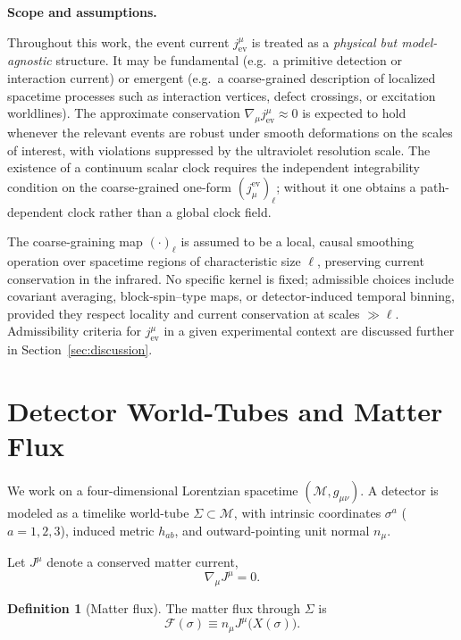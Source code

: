 \documentclass[11pt, a4paper]{article}
\theoremstyle{definition}
\newtheorem{definition}{Definition}[section]
\theoremstyle{plain}
\theoremstyle{remark}
\numberwithin{equation}{section}
\newcommand{\Sig}{\Sigma}
\newcommand{\F}{\mathcal{F}}
\begin{document}
        \medskip\noindent\textbf{Scope and assumptions.}\par
            Throughout this work, the event current $j^\mu_{\mathrm{ev}}$ is treated as a \emph{physical but model-agnostic} structure. It may be fundamental (e.g.\ a primitive detection or interaction current) or emergent (e.g.\ a coarse-grained description of localized spacetime processes such as interaction vertices, defect crossings, or excitation worldlines). The approximate conservation $\nabla_\mu j^\mu_{\mathrm{ev}}\approx 0$ is expected to hold whenever the relevant events are robust under smooth deformations on the scales of interest, with violations suppressed by the ultraviolet resolution scale. The existence of a continuum scalar clock requires the independent integrability condition on the coarse-grained one-form $(j^{\mathrm{ev}}_\mu)_\ell$; without it one obtains a path-dependent clock rather than a global clock field.
            
            The coarse-graining map $(\cdot)_\ell$ is assumed to be a local, causal smoothing operation over spacetime regions of characteristic size $\ell$, preserving current conservation in the infrared. No specific kernel is fixed; admissible choices include covariant averaging, block-spin--type maps, or detector-induced temporal binning, provided they respect locality and current conservation at scales $\gg\ell$.
            Admissibility criteria for $j^\mu_{\mathrm{ev}}$ in a given experimental context are discussed further in Section~\ref{sec:discussion}.

    \section{Detector World-Tubes and Matter Flux}
    
    We work on a four-dimensional Lorentzian spacetime $(\mathcal{M},g_{\mu\nu})$. A detector is modeled as a timelike world-tube $\Sig \subset \mathcal{M}$, with intrinsic coordinates $\sigma^a$ ($a=1,2,3$), induced metric $h_{ab}$, and outward-pointing unit normal $n_\mu$.
    
    Let $J^\mu$ denote a conserved matter current,
    \begin{equation}
        \nabla_\mu J^\mu = 0 .
    \end{equation}
    
    \begin{definition}[Matter flux]
The matter flux through $\Sig$ is
\begin{equation}
    \F(\sigma) \equiv n_\mu J^\mu\big(X(\sigma)\big).
\end{equation}
    \end{definition}
    
\end{document}
